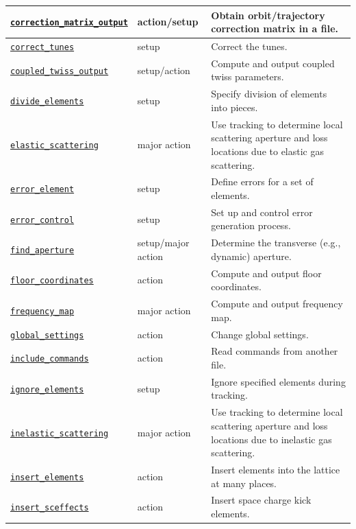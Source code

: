 \documentclass[11pt]{article}
\begin{document}
\begin{longtable}{|p{2.75in}|p{0.75in}|p{2.75in}|}
\hyperref[subsec:correctionmatrixoutput]{\tt correction\_matrix\_output} & action/setup & Obtain orbit/trajectory correction matrix in a file. \\ \hline
\hyperref[subsec:correcttunes]{\tt correct\_tunes} & setup & Correct the tunes. \\ \hline
\hyperref[subsec:coupledtwissoutput]{\tt coupled\_twiss\_output} & setup/action & Compute and output coupled twiss parameters. \\ \hline
\hyperref[subsec:divideelements]{\tt divide\_elements} & setup & Specify division of elements into pieces. \\ \hline
\hyperref[subsec:elasticscattering]{\tt elastic\_scattering} & major action & Use tracking to determine local scattering aperture and loss locations due to elastic gas scattering.\\ \hline
\hyperref[subsec:errorelement]{\tt error\_element} & setup & Define errors for a set of elements. \\ \hline
\hyperref[subsec:errorcontrol]{\tt error\_control} & setup & Set up and control error generation process. \\ \hline
\hyperref[subsec:findaperture]{\tt find\_aperture} & setup/major action & Determine the transverse (e.g., dynamic) aperture. \\ \hline
\hyperref[subsec:floorcoordinates]{\tt floor\_coordinates} & action & Compute and output floor coordinates. \\ \hline
\hyperref[subsec:frequencymap]{\tt frequency\_map} & major action & Compute and output frequency map. \\ \hline
\hyperref[subsec:globalsettings]{\tt global\_settings} & action & Change global settings.\\ \hline
\hyperref[subsec:includecommands]{\tt include\_commands} & action & Read commands from another file.\\ \hline
\hyperref[subsec:ignoreelements]{\tt ignore\_elements} & setup & Ignore specified elements during tracking. \\ \hline
\hyperref[subsec:inelasticscattering]{\tt inelastic\_scattering} & major action & Use tracking to determine local scattering aperture and loss locations due to inelastic gas scattering.\\ \hline
\hyperref[subsec:insertelements]{\tt insert\_elements} & action & Insert elements into the lattice at many places. \\ \hline
\hyperref[subsec:insertsceffects]{\tt insert\_sceffects} & action & Insert space charge kick elements. \\ \hline

\end{longtable}
\end{document}
